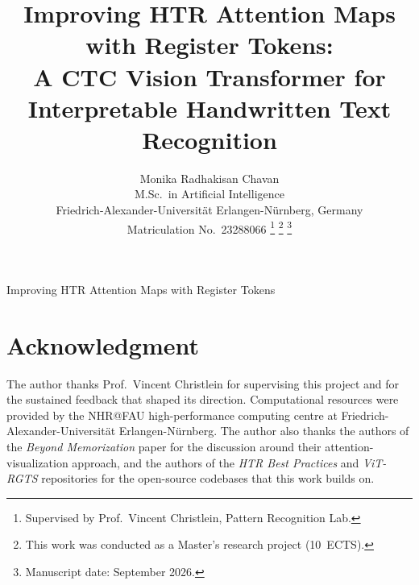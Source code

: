 \documentclass[journal,onecolumn]{IEEEtran}
\begin{document}
\title{Improving HTR Attention Maps with Register Tokens:\\
A CTC Vision Transformer for Interpretable Handwritten Text Recognition}

\author{Monika Radhakisan Chavan\\
M.Sc.\ in Artificial Intelligence\\
Friedrich-Alexander-Universit\"{a}t Erlangen-N\"{u}rnberg, Germany\\
Matriculation No.\ 23288066%
\thanks{Supervised by Prof.\ Vincent Christlein, Pattern Recognition Lab.}%
\thanks{This work was conducted as a Master's research project (10~ECTS).}%
\thanks{Manuscript date: September 2026.}%
}

%
{Improving HTR Attention Maps with Register Tokens}

\maketitle

















\section*{Acknowledgment}
The author thanks Prof.\ Vincent Christlein for supervising this project and for the sustained feedback that shaped its direction. Computational resources were provided by the NHR@FAU high-performance computing centre at Friedrich-Alexander-Universit\"{a}t Erlangen-N\"{u}rnberg. The author also thanks the authors of the \emph{Beyond Memorization} paper for the discussion around their attention-visualization approach, and the authors of the \emph{HTR Best Practices} and \emph{ViT-RGTS} repositories for the open-source codebases that this work builds on.



\end{document}
